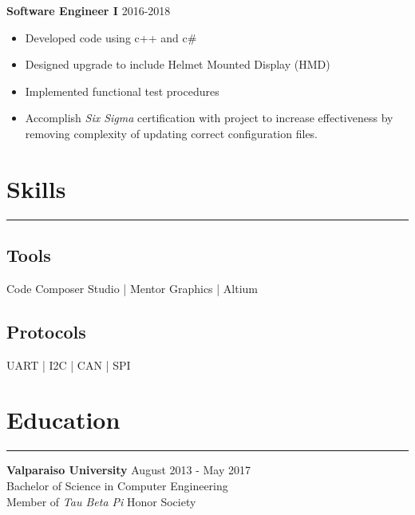 \documentclass[10pt, letterpaper]{article}
\begin{document}
\textbf{Software Engineer I} \hfill 2016-2018 \\
\vspace{-4ex}
\begin{itemize}[noitemsep]
    \item Developed code using c++ and c\#
    \item Designed upgrade to include Helmet Mounted Display (HMD)
    \item Implemented functional test procedures
    \item Accomplish \emph{Six Sigma} certification with project to increase effectiveness by removing complexity of updating correct configuration files.
\end{itemize}



\section*{Skills} \vspace{-2ex} \hrule
\vspace{1ex}

\subsection*{Tools}
Code Composer Studio | Mentor Graphics | Altium \\

\subsection*{Protocols}
UART | I2C | CAN | SPI



\section*{Education} \vspace{-2ex} \hrule
\vspace{1ex}

\textbf{Valparaiso University} \hfill August 2013 - May 2017 \\
\indent Bachelor of Science in Computer Engineering \\
\indent \indent Member of \emph{Tau Beta Pi} Honor Society
\end{document}
